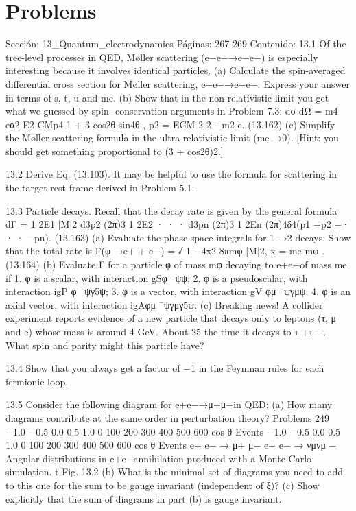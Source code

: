 \section*{Problems}
Sección: 13_Quantum_electrodynamics
Páginas: 267-269
Contenido:
13.1 Of the tree-level processes in QED, Møller scattering (e−e−→e−e−) is especially
interesting because it involves identical particles.
(a) Calculate the spin-averaged differential cross section for Møller scattering,
e−e−→e−e−. Express your answer in terms of s, t, u and me.
(b) Show that in the non-relativistic limit you get what we guessed by spin-
conservation arguments in Problem 7.3:
dσ
dΩ = m4
eα2
E2
CMp4
1 + 3 cos2θ
sin4θ
,
p2 =
ECM
2
2
−m2
e.
(13.162)
(c) Simplify the Møller scattering formula in the ultra-relativistic limit (me →0).
[Hint: you should get something proportional to (3 + cos2θ)2.]

13.2 Derive Eq. (13.103). It may be helpful to use the formula for scattering in the target
rest frame derived in Problem 5.1.

13.3 Particle decays. Recall that the decay rate is given by the general formula
dΓ =
1
2E1
|M|2 d3p2
(2π)3
1
2E2
· · · d3pn
(2π)3
1
2En
(2π)4δ4(p1 −p2 −· · · −pn). (13.163)
(a) Evaluate the phase-space integrals for 1 →2 decays. Show that the total rate is
Γ(φ →e+ + e−) =
√
1 −4x2
8πmφ
|M|2,
x = me
mφ
.
(13.164)
(b) Evaluate Γ for a particle φ of mass mφ decaying to e+e−of mass me if
1. φ is a scalar, with interaction gSφ ¯ψψ;
2. φ is a pseudoscalar, with interaction igP φ ¯ψγ5ψ;
3. φ is a vector, with interaction gV φμ ¯ψγμψ;
4. φ is an axial vector, with interaction igAφμ ¯ψγμγ5ψ.
(c) Breaking news! A collider experiment reports evidence of a new particle that
decays only to leptons (τ, μ and e) whose mass is around 4 GeV. About 25%
the time it decays to τ +τ −. What spin and parity might this particle have?

13.4 Show that you always get a factor of −1 in the Feynman rules for each fermionic
loop.

13.5 Consider the following diagram for e+e−→μ+μ−in QED:
(a) How many diagrams contribute at the same order in perturbation theory?
Problems
249
−1.0
−0.5
0.0
0.5
1.0
0
100
200
300
400
500
600
cos θ
Events
−1.0
−0.5
0.0
0.5
1.0
0
100
200
300
400
500
600
cos θ
Events
e+ e− → μ+ μ−
e+ e− → νμνμ
−
Angular distributions in e+e−annihilation produced with a Monte-Carlo simulation.
t
Fig. 13.2
(b) What is the minimal set of diagrams you need to add to this one for the sum to
be gauge invariant (independent of ξ)?
(c) Show explicitly that the sum of diagrams in part (b) is gauge invariant.

